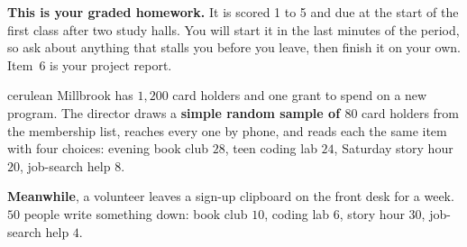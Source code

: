\documentclass[12pt]{article}
\begin{document}

\vspace{0.12in}

\begin{remindbox}
\small
\textbf{This is your graded homework.} It is scored 1 to 5 and due at the start of the
first class after two study halls. You will start it in the last minutes of the period, so ask about anything that stalls
you before you leave, then finish it on your own. Item~6 is your project report.
\end{remindbox}

\vspace{0.08in}

\boxguard[20]
\begin{scenariobox}{cerulean}
Millbrook has $1{,}200$ card holders and one grant to spend on a new program. The director draws
a \textbf{simple random sample of $80$} card holders from the membership list, reaches every one
by phone, and reads each the same item with four choices: evening book club $28$, teen coding
lab $24$, Saturday story hour $20$, job-search help $8$.

\vspace{2pt}
\textbf{Meanwhile}, a volunteer leaves a sign-up clipboard on the front desk for a week. $50$
people write something down: book club $10$, coding lab $6$, story hour $30$, job-search help $4$.
\end{scenariobox}

\vspace{0.08in}
\end{document}
